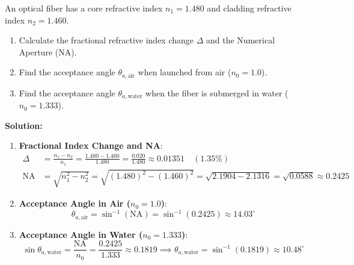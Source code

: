 \begin{example}
An optical fiber has a core refractive index $n_1 = 1.480$ and cladding refractive index $n_2 = 1.460$.
\begin{enumerate}
    \item Calculate the fractional refractive index change $\Delta$ and the Numerical Aperture ($\text{NA}$).
    \item Find the acceptance angle $\theta_{a,\text{air}}$ when launched from air ($n_0 = 1.0$).
    \item Find the acceptance angle $\theta_{a,\text{water}}$ when the fiber is submerged in water ($n_0 = 1.333$).
\end{enumerate}

\textbf{Solution:}
\begin{enumerate}
    \item \textbf{Fractional Index Change and NA}:
    \begin{align*}
        \Delta &= \frac{n_1 - n_2}{n_1} = \frac{1.480 - 1.460}{1.480} = \frac{0.020}{1.480} \approx 0.01351 \quad (1.35\%) \\
        \text{NA} &= \sqrt{n_1^2 - n_2^2} = \sqrt{(1.480)^2 - (1.460)^2} = \sqrt{2.1904 - 2.1316} = \sqrt{0.0588} \approx 0.2425
    \end{align*}
    
    \item \textbf{Acceptance Angle in Air ($n_0 = 1.0$)}:
    \begin{equation*}
        \theta_{a,\text{air}} = \sin^{-1}(\text{NA}) = \sin^{-1}(0.2425) \approx 14.03^\circ
    \end{equation*}
    
    \item \textbf{Acceptance Angle in Water ($n_0 = 1.333$)}:
    \begin{equation*}
        \sin\theta_{a,\text{water}} = \frac{\text{NA}}{n_0} = \frac{0.2425}{1.333} \approx 0.1819 \implies \theta_{a,\text{water}} = \sin^{-1}(0.1819) \approx 10.48^\circ
    \end{equation*}
\end{enumerate}
\end{example}

